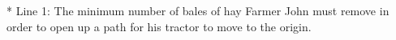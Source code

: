 * Line 1: The minimum number of bales of hay Farmer John must remove         in order to open up a path for his tractor to move to the         origin.